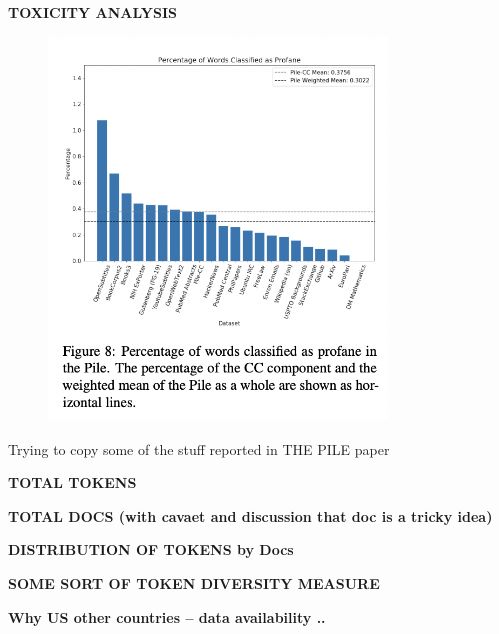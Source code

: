 \textbf{TOXICITY ANALYSIS}
\begin{figure}[h!]
\centering
\includegraphics[width=90mm]{Toxicity.png}
\caption{}
\label{fig:toxicity}
\end{figure}




Trying to copy some of the stuff reported in THE PILE paper 

\textbf{TOTAL TOKENS }

\vspace{10mm}

\textbf{TOTAL DOCS (with cavaet and discussion that doc is a tricky idea)}

\vspace{10mm}

\textbf{DISTRIBUTION OF TOKENS by Docs}

\vspace{10mm}

\textbf{SOME SORT OF TOKEN DIVERSITY MEASURE }

\vspace{10mm}





\textbf{Why US other countries -- data availability .. 
}




